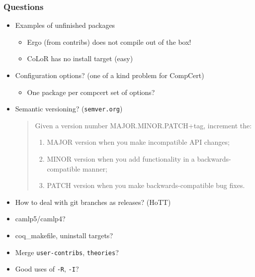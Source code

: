 \documentclass[9pt]{beamer}
\begin{document}
\begin{frame}
  \frametitle{Questions}
  
  \begin{itemize}
  \item Examples of \alert{unfinished} packages
    \begin{itemize}
    \item Ergo (from contribs) does not compile out of the box!
    \item CoLoR has no install target (easy)
    \end{itemize}
    \pause
  \item Configuration options? (one of a kind problem for CompCert)
    \begin{itemize}
    \item One package per compcert set of options?
    \end{itemize}
    \pause
  \item Semantic versioning? ({\tt semver.org}) \\
    \begin{quote}
      Given a version number MAJOR.MINOR.PATCH+tag, increment the:
      \begin{enumerate}
      \item MAJOR version when you make incompatible API changes;
      \item MINOR version when you add functionality in a
        backwards-compatible manner;
      \item PATCH version when you make backwards-compatible bug
        fixes.
      \end{enumerate}
    \end{quote}
    \pause
  \item How to deal with git branches as releases? (HoTT)
  \item camlp5/camlp4?
  \item coq\_makefile, uninstall targets?
  \item Merge {\tt user-contribs}, {\tt theories}?
  \item Good uses of {\tt -R}, {\tt -I}?
  \end{itemize}
\end{frame}
\end{document}
